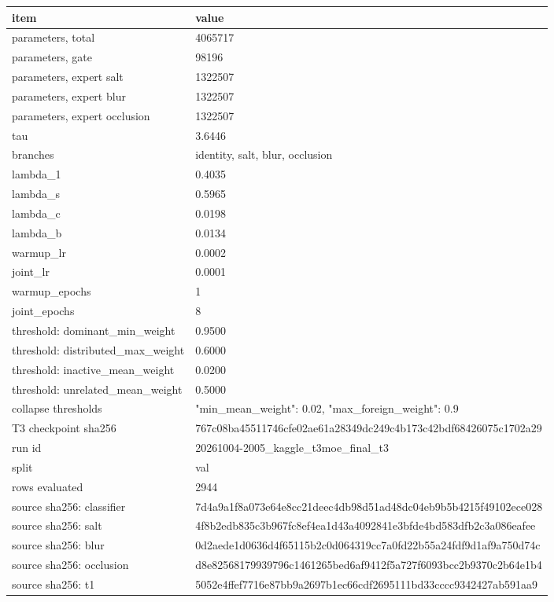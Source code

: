 \begin{tabular}{ll}
\hline
item & value \\
\hline
parameters, total & 4065717 \\
parameters, gate & 98196 \\
parameters, expert salt & 1322507 \\
parameters, expert blur & 1322507 \\
parameters, expert occlusion & 1322507 \\
tau & 3.6446 \\
branches & identity, salt, blur, occlusion \\
lambda\_1 & 0.4035 \\
lambda\_s & 0.5965 \\
lambda\_c & 0.0198 \\
lambda\_b & 0.0134 \\
warmup\_lr & 0.0002 \\
joint\_lr & 0.0001 \\
warmup\_epochs & 1 \\
joint\_epochs & 8 \\
threshold: dominant\_min\_weight & 0.9500 \\
threshold: distributed\_max\_weight & 0.6000 \\
threshold: inactive\_mean\_weight & 0.0200 \\
threshold: unrelated\_mean\_weight & 0.5000 \\
collapse thresholds & {"min\_mean\_weight": 0.02, "max\_foreign\_weight": 0.9} \\
T3 checkpoint sha256 & 767c08ba45511746cfe02ae61a28349dc249c4b173c42bdf68426075c1702a29 \\
run id & 20261004-2005\_kaggle\_t3moe\_final\_t3 \\
split & val \\
rows evaluated & 2944 \\
source sha256: classifier & 7d4a9a1f8a073e64e8cc21deec4db98d51ad48dc04eb9b5b4215f49102ece028 \\
source sha256: salt & 4f8b2edb835c3b967fc8ef4ea1d43a4092841e3bfde4bd583dfb2c3a086eafee \\
source sha256: blur & 0d2aede1d0636d4f65115b2c0d064319cc7a0fd22b55a24fdf9d1af9a750d74c \\
source sha256: occlusion & d8e82568179939796c1461265bed6af9412f5a727f6093bcc2b9370c2b64e1b4 \\
source sha256: t1 & 5052e4ffef7716e87bb9a2697b1ec66cdf2695111bd33cccc9342427ab591aa9 \\
\hline
\end{tabular}
